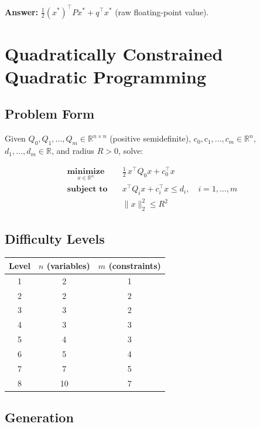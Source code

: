 \documentclass[12pt]{article}
\begin{document}
\noindent\textbf{Answer:} $\tfrac{1}{2}(x^*)^\top P x^* + q^\top x^*$ (raw floating-point value).

\section{Quadratically Constrained Quadratic Programming}

\subsection{Problem Form}

Given $Q_0, Q_1, \ldots, Q_m \in \mathbb{R}^{n \times n}$ (positive semidefinite),
$c_0, c_1, \ldots, c_m \in \mathbb{R}^n$, $d_1, \ldots, d_m \in \mathbb{R}$,
and radius $R > 0$, solve:

\begin{align*}
    \underset{x \in \mathbb{R}^n}{\textbf{minimize}}   \quad & \tfrac{1}{2}\, x^\top Q_0 x + c_0^\top x \\
    \textbf{subject to} \quad                                  & x^\top Q_i x + c_i^\top x \leq d_i, \quad i = 1, \ldots, m \\
                                                               & \|x\|_2^2 \leq R^2
\end{align*}

\subsection{Difficulty Levels}

\begin{center}
\begin{tabular}{c|cc}
\hline
\textbf{Level} & $n$ (variables) & $m$ (constraints) \\
\hline
1 & 2  & 1 \\
2 & 2  & 2 \\
3 & 3  & 2 \\
4 & 3  & 3 \\
5 & 4  & 3 \\
6 & 5  & 4 \\
7 & 7  & 5 \\
8 & 10 & 7 \\
\hline
\end{tabular}
\end{center}

\subsection{Generation}
\end{document}
